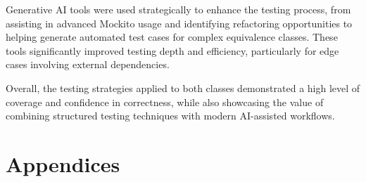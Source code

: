 \documentclass[12pt]{article}
\begin{document}
    Generative AI tools were used strategically to enhance the testing process,
        from assisting in advanced Mockito usage and identifying refactoring
        opportunities to helping generate automated test cases for complex
        equivalence classes.
    These tools significantly improved testing depth and efficiency,
        particularly for edge cases involving external dependencies.

    Overall, the testing strategies applied to both classes demonstrated a high
        level of coverage and confidence in correctness, while also showcasing
        the value of combining structured testing techniques with modern
        AI-assisted workflows.

    \pagebreak

    \vspace*{5cm}
    \part*{Appendices}
    \thispagestyle{empty}
    \pagebreak
\end{document}
